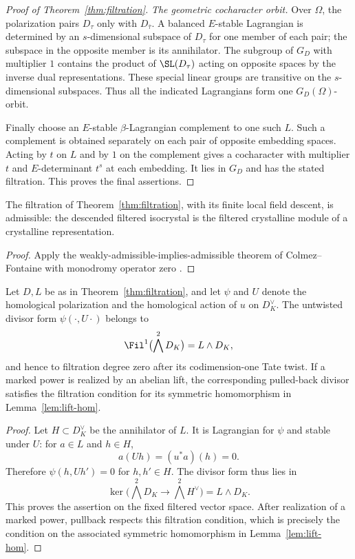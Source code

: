\begin{proof}[Proof of Theorem~\ref{thm:filtration}]
\medskip\noindent
\emph{The geometric cocharacter orbit.}
Over $\Omega$, the polarization pairs $D_\tau$ only with
$D_{\bar\tau}$.  A balanced $E$-stable Lagrangian is determined by an
$s$-dimensional subspace of $D_\tau$ for one member of each pair;
the subspace in the opposite member is its annihilator.  The
subgroup of $G_D$ with multiplier $1$ contains the product of
$\SL(D_\tau)$ acting on opposite spaces by the inverse dual
representations.  These special linear groups are transitive on
the $s$-dimensional subspaces.  Thus all the indicated Lagrangians
form one $G_D(\Omega)$-orbit.

Finally choose an $E$-stable $\beta$-Lagrangian complement to one
such $L$.  Such a complement is obtained separately on each pair
of opposite embedding spaces.  Acting by $t$ on $L$ and by $1$
on the complement gives a cocharacter with multiplier $t$ and
$E$-determinant $t^s$ at each embedding.  It lies in $G_D$ and has
the stated filtration.  This proves the final assertions.
\end{proof}

\begin{corollary}
\label{cor:filtration-admissible}
The filtration of Theorem~\ref{thm:filtration}, with its finite local
field descent, is admissible: the descended filtered isocrystal is
the filtered crystalline module of a crystalline representation.
\end{corollary}

\begin{proof}
Apply the weakly-admissible-implies-admissible theorem of
Colmez--Fontaine with monodromy operator zero
\cite[Theorem~A]{ColmezFontaine2000}.
\end{proof}

\begin{corollary}
\label{cor:filtration-divisor}
Let \(D,L\) be as in Theorem~\ref{thm:filtration}, and let \(\psi\)
and \(U\) denote the homological polarization and the homological
action of \(u\) on \(D_K^\vee\). The untwisted divisor form
\(\psi(\cdot,U\cdot)\) belongs to
\[
 \Fil^1\bigl(\bigwedge^2D_K\bigr)=L\wedge D_K,
\]
and hence to filtration degree zero after its codimension-one Tate
twist. If a marked power is realized by an abelian lift, the
corresponding pulled-back divisor satisfies the filtration condition
for its symmetric homomorphism in Lemma~\ref{lem:lift-hom}.
\end{corollary}

\begin{proof}
Let \(H\subset D_K^\vee\) be the annihilator of \(L\). It is
Lagrangian for \(\psi\) and stable under \(U\): for \(a\in L\)
and \(h\in H\),
\[
 a(Uh)=(u^*a)(h)=0.
\]
Therefore \(\psi(h,Uh')=0\) for \(h,h'\in H\). The divisor form
thus lies in
\[
 \ker\bigl(\bigwedge^2D_K\longrightarrow\bigwedge^2H^\vee\bigr)
       =L\wedge D_K.
\]
This proves the assertion on the fixed filtered vector space. After
realization of a marked power, pullback respects this filtration
condition, which is precisely the condition on the associated
symmetric homomorphism in Lemma~\ref{lem:lift-hom}.
\end{proof}
